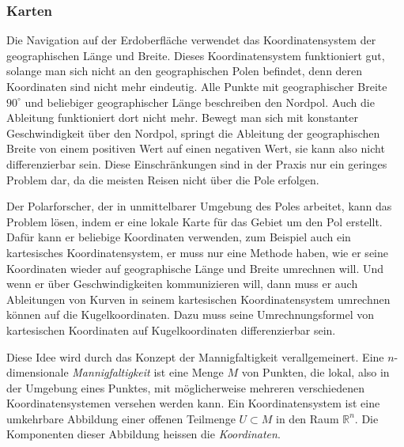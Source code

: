 \subsubsection{Karten}
Die Navigation auf der Erdoberfläche verwendet das Koordinatensystem
der geographischen Länge und Breite.
Dieses Koordinatensystem funktioniert gut, solange man sich nicht an
den geographischen Polen befindet, denn deren Koordinaten sind
nicht mehr eindeutig.
Alle Punkte mit geographischer Breite $90^\circ$ und beliebiger 
geographischer Länge beschreiben den Nordpol.
Auch die Ableitung funktioniert dort nicht mehr.
Bewegt man sich mit konstanter Geschwindigkeit über den Nordpol,
springt die Ableitung der geographischen Breite von einem positiven
Wert auf einen negativen Wert, sie kann also nicht differenzierbar sein.
Diese Einschränkungen sind in der Praxis nur ein geringes Problem dar,
da die meisten Reisen nicht über die Pole erfolgen.

Der Polarforscher, der in unmittelbarer Umgebung des Poles arbeitet,
kann das Problem lösen, indem er eine lokale Karte für das Gebiet
um den Pol erstellt.
Dafür kann er beliebige Koordinaten verwenden, zum Beispiel auch
ein kartesisches Koordinatensystem, er muss nur eine Methode haben,
wie er seine Koordinaten wieder auf geographische Länge und Breite
umrechnen will.
Und wenn er über Geschwindigkeiten kommunizieren will, dann muss
er auch Ableitungen von Kurven in seinem kartesischen Koordinatensystem
umrechnen können auf die Kugelkoordinaten.
Dazu muss seine Umrechnungsformel von kartesischen Koordinaten
auf Kugelkoordinaten differenzierbar sein.

Diese Idee wird durch das Konzept der Mannigfaltigkeit verallgemeinert.
Eine $n$-dimensionale {\em Mannigfaltigkeit} ist eine Menge $M$ von Punkten,
die lokal, also in der Umgebung eines Punktes, mit möglicherweise mehreren
verschiedenen Koordinatensystemen versehen werden kann.
Ein Koordinatensystem ist eine umkehrbare Abbildung einer offenen Teilmenge
$U\subset M$ in den Raum $\mathbb{R}^n$.
Die Komponenten dieser Abbildung heissen die {\em Koordinaten}.

